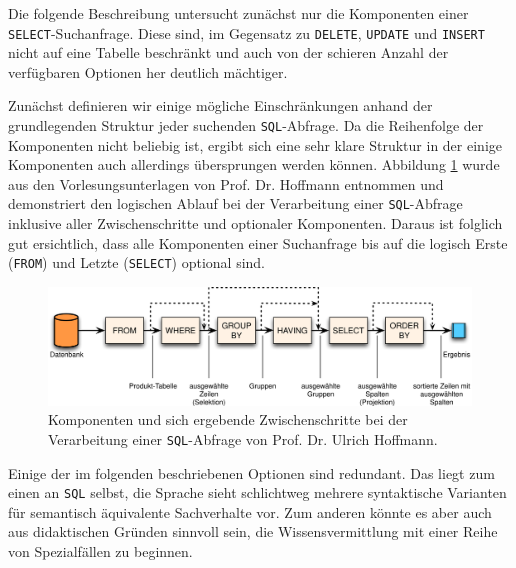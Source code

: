 Die folgende Beschreibung untersucht zunächst nur die Komponenten einer \texttt{SELECT}-Suchanfrage. Diese sind, im Gegensatz zu \texttt{DELETE}, \texttt{UPDATE} und \texttt{INSERT} nicht auf eine Tabelle beschränkt und auch von der schieren Anzahl der verfügbaren Optionen her deutlich mächtiger.

Zunächst definieren wir einige mögliche Einschränkungen anhand der grundlegenden Struktur jeder suchenden \texttt{SQL}-Abfrage. Da die Reihenfolge der Komponenten nicht beliebig ist, ergibt sich eine sehr klare Struktur in der einige Komponenten auch allerdings übersprungen werden können. Abbildung \ref{fig:sql-steps} wurde aus den Vorlesungsunterlagen von Prof. Dr. Hoffmann entnommen und demonstriert den logischen Ablauf bei der Verarbeitung einer \texttt{SQL}-Abfrage inklusive aller Zwischenschritte und optionaler Komponenten. Daraus ist folglich gut ersichtlich, dass alle Komponenten einer Suchanfrage bis auf die logisch Erste (\texttt{FROM}) und Letzte (\texttt{SELECT}) optional sind.

\begin{figure}
  \centering \includegraphics{images/sql-steps.png}
  \caption{Komponenten und sich ergebende Zwischenschritte bei der Verarbeitung einer \texttt{SQL}-Abfrage von Prof. Dr. Ulrich Hoffmann.}
  \label{fig:sql-steps}
\end{figure}

Einige der im folgenden beschriebenen Optionen sind redundant. Das liegt zum einen an \texttt{SQL} selbst, die Sprache sieht schlichtweg mehrere syntaktische Varianten für semantisch äquivalente Sachverhalte vor. Zum anderen könnte es aber auch aus didaktischen Gründen sinnvoll sein, die Wissensvermittlung mit einer Reihe von Spezialfällen zu beginnen.

